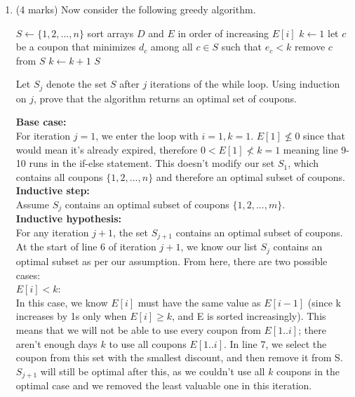 \documentclass[11pt]{article}
\begin{document}
\begin{enumerate}
    
    \clearpage
    
    \item (4 marks) Now consider the following greedy algorithm. 
    
    \begin{algorithmic}[1]
            \State $S \leftarrow \{1,2,\dots,n\}$ 
            \State sort arrays $D$ and $E$ in order of increasing $E[i]$
            \State $k \leftarrow 1$
                    \State let $c$ be a coupon that minimizes $d_c$ among all $c\in S$ such that $e_c < k$ 
                    \State remove $c$ from $S$
                \Else
                    \State $k \leftarrow k + 1$
                \EndIf
            \EndFor
            \State \Return $S$
        \EndProcedure
    \end{algorithmic}
    Let $S_j$ denote the set $S$ after $j$ iterations of the while loop. Using induction on $j$, prove that the algorithm returns an optimal set of coupons. 
    
    \begin{soln}
    
    \textbf{Base case:} \\
    For iteration $j=1$, we enter the loop with $i=1, k=1$. $E[1] \nleq 0$ since that would mean it's already expired, therefore $0 < E[1] \nless k=1$ meaning line 9-10 runs in the if-else statement. This doesn't modify our set $S_1$, which contains all coupons $\{1, 2, ... , n\}$ and therefore an optimal subset of coupons. \\
    
    \textbf{Inductive step:} \\
    Assume $S_j$ contains an optimal subset of coupons $\{1, 2, ... , m\}$. \\
    
    \textbf{Inductive hypothesis:} \\
    For any iteration $j+1$, the set $S_{j+1}$ contains an optimal subset of coupons. \\
    
    At the start of line 6 of iteration $j+1$, we know our list $S_j$ contains an optimal subset as per our assumption. From here, there are two possible cases:\\
    
    $E[i] < k$: \\
    In this case, we know $ E[i]$ must have the same value as $ E[i-1]$ (since k increases by 1s only when $E[i]\geq k$, and E is sorted increasingly). This means that we will not be able to use every coupon from $E[1..i]$; there aren't enough days $k$ to use all coupons $E[1..i]$. In line 7, we select the coupon from this set with the smallest discount, and then remove it from S. $S_{j+1}$ will still be optimal after this, as we couldn't use all $k$ coupons in the optimal case and we removed the least valuable one in this iteration. \\
    

\end{soln}
\end{enumerate}
\end{document}
